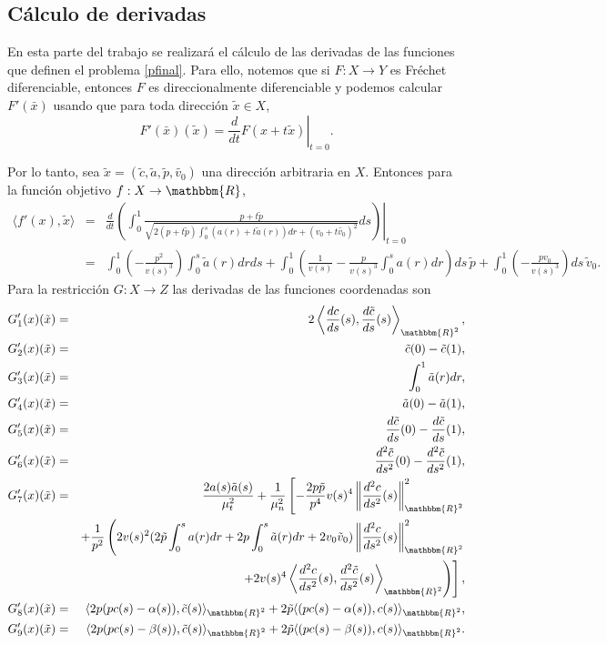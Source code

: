 \documentclass[a4paper,10pt]{book}
\newcommand{\R}{\mathbbm{R}}
\newcommand{\arr}{\rightarrow}
\newcommand{\bx}{\bar{x}}
\begin{document}
\subsection{Cálculo de derivadas}\label{calcderivadasinf}
En esta parte del trabajo se realizará el cálculo de las derivadas de las funciones que definen el problema \eqref{pfinal}. Para ello, notemos que si $F:X\arr Y$ es Fréchet diferenciable, entonces $F$ es direccionalmente diferenciable y podemos calcular $F'(\bx)$ usando que para toda dirección $\tilde x\in X$,
$$F'(\bx)(\tilde x)=\left.\frac{d}{dt}F(x+t\tilde{x})\right|_{t=0}.$$

Por lo tanto, sea $\tilde{x}=(\tilde{c},\tilde{a},\tilde{p},\tilde{v_0})$ una dirección arbitraria en $X$. Entonces para la función objetivo $f:X\arr\R$,
\begin{eqnarray*}
 \langle f'(x), \tilde{x}\rangle
&=&\frac{d}{dt}\left.\left( \int_{0}^{1}\textstyle \frac{p+t\tilde{p}}{\sqrt{2(p+t\tilde{p}) \int_0^s (a(r)+t\tilde{a}(r))dr + (v_0+t\tilde{v_0})^2}}ds\right)\right|_{t=0}\\
&=&\int_0^1\left(-\frac{p^2}{v(s)^3}\right)\int_0^s\tilde{a}(r)dr ds + \int_0^1\left(\frac{1}{v(s)}-\frac{p}{v(s)^3}\int_0^s a(r)dr\right)ds\, \tilde{p} + \int_0^1\left(-\frac{p v_0}{v(s)^3}\right)ds\, \tilde{v}_0.
\end{eqnarray*}
Para la restricción $G:X\arr Z$ las derivadas de las funciones coordenadas son
\begin{eqnarray*}
G_1'(x)(\tilde{x})
&=&2\left\langle\frac{dc}{ds}(s),\frac{d\tilde{c}}{ds}(s)\right\rangle_{\R^2},\\
G_2'(x)(\tilde{x})&=&\tilde{c}(0)-\tilde{c}(1),\\
G_3'(x)(\tilde{x})&=&\int_0^1 \tilde{a}(r)dr,\\
G_4'(x)(\tilde{x})&=&\tilde{a}(0)-\tilde{a}(1),\\
G_5'(x)(\tilde{x})&=&\frac{d\tilde{c}}{ds}(0)-\frac{d\tilde{c}}{ds}(1),\\
G_6'(x)(\tilde{x})&=&\frac{d^2\tilde{c}}{ds^2}(0)-\frac{d^2\tilde{c}}{ds^2}(1),\\
G_7'(x)(\tilde{x})&=&\frac{2a(s)\tilde{a}(s)}{\mu_t^2} + \frac{1}{\mu_n^2}\left[-\frac{2p\tilde{p}}{p^4}v(s)^4\left\|\frac{d^2c}{ds^2}(s)\right\|_{\R^2}^2\right.\\
&&+\frac{1}{p^2}\left(2v(s)^2(2\tilde{p}\int_0^s a(r)dr +2p\int_0^s\tilde{a}(r)dr+2v_0\tilde{v}_0) \left\|\frac{d^2c}{ds^2}(s)\right\|_{\R^2}^2\right.\\
&&\left.\left.+ 2v(s)^4\left\langle\frac{d^2c}{ds^2}(s) , \frac{d^2\tilde{c}}{ds^2}(s)\right\rangle_{\R^2}\right)\right],\\
G_8'(x)(\tilde{x})&=&\langle2p(pc(s)-\alpha(s)) , \tilde{c}(s)\rangle_{\R^2} + 2\tilde{p}\langle(pc(s)-\alpha(s)) , c(s)\rangle_{\R^2},\\
G_9'(x)(\tilde{x})&=&\langle2p(pc(s)-\beta(s)) , \tilde{c}(s)\rangle_{\R^2} + 2\tilde{p}\langle(pc(s)-\beta(s)) , c(s)\rangle_{\R^2}.\\
\end{eqnarray*}
\end{document}
